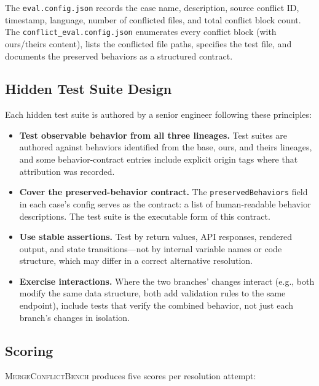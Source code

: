 \documentclass[11pt,letterpaper]{article}
\begin{document}
The \texttt{eval.config.json} records the case name, description, source conflict ID, timestamp, language, number of conflicted files, and total conflict block count. The \texttt{conflict\_eval.config.json} enumerates every conflict block (with ours/theirs content), lists the conflicted file paths, specifies the test file, and documents the preserved behaviors as a structured contract.

\subsection{Hidden Test Suite Design}

Each hidden test suite is authored by a senior engineer following these principles:

\begin{itemize}[leftmargin=2em]
\item \textbf{Test observable behavior from all three lineages.} Test suites are authored against behaviors identified from the base, ours, and theirs lineages, and some behavior-contract entries include explicit origin tags where that attribution was recorded.

\item \textbf{Cover the preserved-behavior contract.} The \texttt{preservedBehaviors} field in each case's config serves as the contract: a list of human-readable behavior descriptions. The test suite is the executable form of this contract.

\item \textbf{Use stable assertions.} Test by return values, API responses, rendered output, and state transitions---not by internal variable names or code structure, which may differ in a correct alternative resolution.

\item \textbf{Exercise interactions.} Where the two branches' changes interact (e.g., both modify the same data structure, both add validation rules to the same endpoint), include tests that verify the combined behavior, not just each branch's changes in isolation.
\end{itemize}

\subsection{Scoring}

\textsc{MergeConflictBench} produces five scores per resolution attempt:
\end{document}
